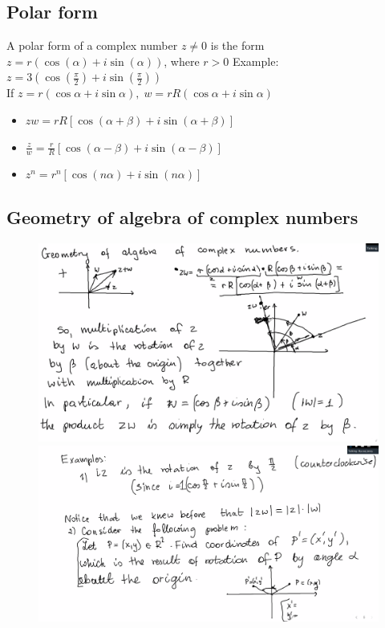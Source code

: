 \documentclass{report}
\begin{document}
\subsection{Polar form}
A polar form of a complex number $z\neq 0$ is the form $z=r(\cos(\alpha) + i\sin(\alpha))$, where $r>0$
Example: \\
\LARGE
$z = 3(\cos(\frac{\pi}{2}) + i\sin(\frac{\pi}{2}))$ \\
\large
If $z=r(\cos\alpha + i\sin\alpha), \; w=rR(\cos\alpha + i\sin\alpha)$\\
\begin{itemize}
	\item $zw = rR[\cos(\alpha + \beta) + i\sin(\alpha + \beta)]$
	\item $\frac{z}{w} = \frac{r}{R}[\cos(\alpha - \beta) + i\sin(\alpha - \beta)]$
	\item $z^n = r^n [\cos(n\alpha) + i\sin(n\alpha)]$
\end{itemize}
\pagebreak
\subsection{Geometry of algebra of complex numbers}
\begin{figure}[h!]
	\includegraphics[scale=0.25]{algebra-lecture1.png}
	\includegraphics[scale=0.25]{2.png}
	\centering
\end{figure}
\end{document}
